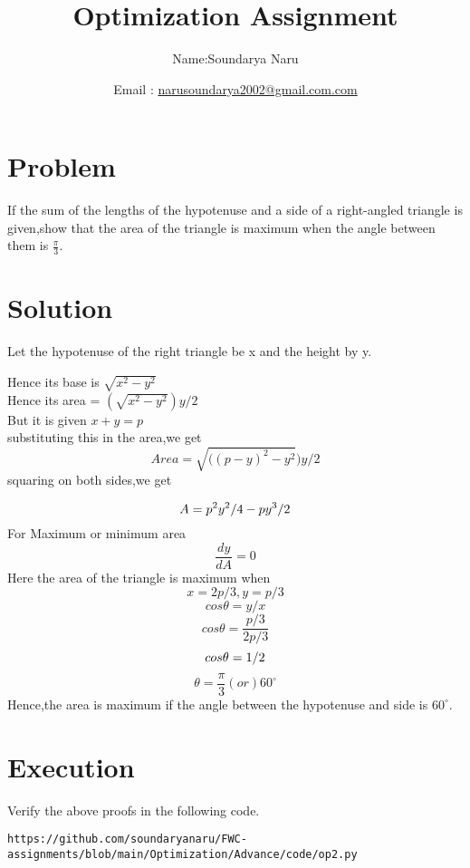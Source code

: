 \documentclass[10pt, a4paper]{article}
\begin{document}
\title{Optimization Assignment}
\author{Name:Soundarya Naru\and Email :  \url{narusoundarya2002@gmail.com.com}}
\date{}
\maketitle
  \section{Problem}
If the sum of the lengths of the hypotenuse and a side of a right-angled triangle is given,show that the area of the triangle is maximum when the angle between them is $\frac{\pi}{3}$.
\section{Solution}
Let the hypotenuse of the right triangle be x and the height by y.\\
\begin{center}
	Hence its base is $\sqrt{{x^2}-{y^2}}$\\
	Hence its area = $(\sqrt{{x^2}-{y^2}}){y}/2$\\
	But it is given $x+y=p$\\
	substituting this in the area,we get\\
	\begin{equation}
	Area=\sqrt{(({p-y})^2-{y^2}}){y}/2
	\end{equation}
	squaring on both sides,we get\\
	\end{center}
	\begin{equation}
	A={p^2}{y^2}/4-{p}{y^3}/2\\
	\end{equation}
For Maximum or minimum area\\
\begin{equation}
\frac{dy}{dA}=0
\end{equation}
Here the area of the triangle is maximum when\\
\begin{equation}
x=2p/3,y=p/3
\end{equation}
\begin{equation}
cos{\theta}=y/x
\end{equation}
\begin{equation}
cos{\theta}=\frac{p/3}{2p/3}
\end{equation}
\begin{equation}
cos{\theta}=1/2\\
\end{equation}
\begin{equation}
\theta=\frac{\pi}{3} (or) {60}^{\circ}
\end{equation}
Hence,the area is maximum if the angle between the hypotenuse and side is ${60}^{\circ}$.\\
\section{Execution}
Verify the above proofs in the following code.\\
\begin{lstlisting}
https://github.com/soundaryanaru/FWC-assignments/blob/main/Optimization/Advance/code/op2.py
\end{lstlisting}
 
\end{document}
